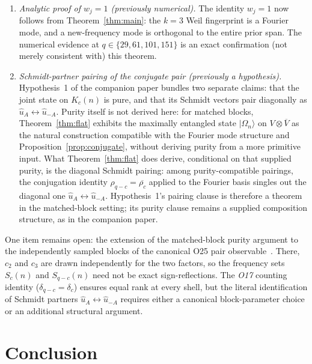 \documentclass[11pt]{article}
\newcommand{\ue}{\hat{u}}
\begin{document}
    \begin{enumerate}
      \item \emph{Analytic proof of $w_j=1$ (previously numerical).}
      The identity $w_j=1$ now follows from Theorem~\ref{thm:main}: the $k{=}3$
      Weil fingerprint is a Fourier mode, and a new-frequency mode is orthogonal to
      the entire prior span.
      The numerical evidence at $q\in\{29,61,101,151\}$ is an exact confirmation
      (not merely consistent with) this theorem.

      \item \emph{Schmidt-partner pairing of the conjugate pair (previously a hypothesis).}
      Hypothesis~1 of the companion paper bundles two separate claims: that the joint
      state on $K_c(n)$ is pure, and that its Schmidt vectors pair diagonally as
      $\ue_A \leftrightarrow \ue_{-A}$.
      Purity itself is not derived here: for matched blocks, Theorem~\ref{thm:flat}
      exhibits the maximally entangled state $|\Omega_n\rangle$ on $V\otimes\overline{V}$
      as the natural construction compatible with the Fourier mode structure and
      Proposition~\ref{prop:conjugate}, without deriving purity from a more primitive
      input.
      What Theorem~\ref{thm:flat} does derive, conditional on that supplied purity, is
      the diagonal Schmidt pairing: among purity-compatible pairings, the conjugation
      identity $\rho_{q-c} = \overline{\rho_c}$ applied to the Fourier basis singles out
      the diagonal one $\ue_A \leftrightarrow \ue_{-A}$.
      Hypothesis~1's pairing clause is therefore a theorem in the matched-block setting;
      its purity clause remains a supplied composition structure, as in the companion
      paper.
    \end{enumerate}

    One item remains open: the extension of the matched-block purity argument to the
    independently sampled blocks of the canonical O25 pair observable~\cite{Beau2026a21}.
    There, $c_2$ and $c_3$ are drawn independently for the two factors, so the frequency
    sets $S_c(n)$ and $S_{q-c}(n)$ need not be exact sign-reflections.
    The \emph{O17} counting identity ($\delta_{q-c}=\delta_c$) ensures equal rank
    at every shell, but the literal identification of Schmidt partners $\ue_A
  \leftrightarrow \ue_{-A}$ requires either a canonical block-parameter choice or
    an additional structural argument.

  \section{Conclusion}
    \label{sec:conclusion}
\end{document}
